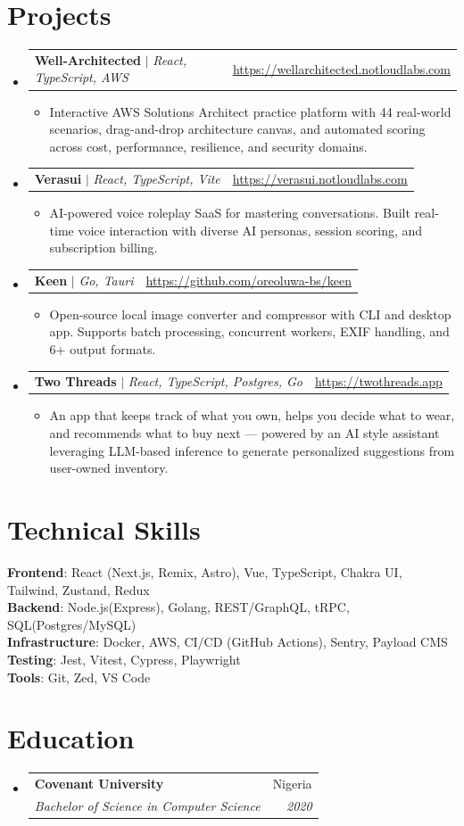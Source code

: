 \documentclass[letterpaper,11pt]{article}
\makeatletter
\newcommand{\resumeItem}[1]{
  \item\small{
    {#1 \vspace{-2pt}}
  }
}
\newcommand{\resumeSubheading}[4]{
  \vspace{-2pt}\item
    \begin{tabular*}{0.97\textwidth}[t]{l@{\extracolsep{\fill}}r}
      \textbf{#1} & #2 \\
      \textit{\small#3} & \textit{\small #4} \\
    \end{tabular*}\vspace{-7pt}
}
\newcommand{\resumeProjectHeading}[2]{
    \item
    \begin{tabular*}{0.97\textwidth}{l@{\extracolsep{\fill}}r}
      \small#1 & #2 \\
    \end{tabular*}\vspace{-7pt}
}
\newcommand{\resumeSubHeadingListStart}{\begin{itemize}[leftmargin=0.15in, label={}]}
\newcommand{\resumeSubHeadingListEnd}{\end{itemize}}
\newcommand{\resumeItemListStart}{\begin{itemize}}
\newcommand{\resumeItemListEnd}{\end{itemize}\vspace{-5pt}}
\makeatother
\begin{document}
  \section{Projects}
      \resumeSubHeadingListStart
        \resumeProjectHeading
            {\textbf{Well-Architected} $|$ \emph{React, TypeScript, AWS}}{\url{https://wellarchitected.notloudlabs.com}}
            \resumeItemListStart
              \resumeItem{Interactive AWS Solutions Architect practice platform with 44 real-world scenarios, drag-and-drop architecture canvas, and automated scoring across cost, performance, resilience, and security domains.}
            \resumeItemListEnd
        \resumeProjectHeading
            {\textbf{Verasui} $|$ \emph{React, TypeScript, Vite}}{\url{https://verasui.notloudlabs.com}}
            \resumeItemListStart
              \resumeItem{AI-powered voice roleplay SaaS for mastering conversations. Built real-time voice interaction with diverse AI personas, session scoring, and subscription billing.}
            \resumeItemListEnd
        \resumeProjectHeading
            {\textbf{Keen} $|$ \emph{Go, Tauri}}{\url{https://github.com/oreoluwa-bs/keen}}
            \resumeItemListStart
              \resumeItem{Open-source local image converter and compressor with CLI and desktop app. Supports batch processing, concurrent workers, EXIF handling, and 6+ output formats.}
            \resumeItemListEnd
        \resumeProjectHeading
            {\textbf{Two Threads} $|$ \emph{React, TypeScript, Postgres, Go}}{\url{https://twothreads.app}}
            \resumeItemListStart
              \resumeItem{An app that keeps track of what you own, helps you decide what to wear, and recommends what to buy next — powered by an AI style assistant leveraging LLM-based inference to generate personalized suggestions from user-owned inventory.}
            \resumeItemListEnd
      \resumeSubHeadingListEnd



\section{Technical Skills}
 \begin{itemize}[leftmargin=0.15in, label={}]
    \small{\item{
     \textbf{Frontend}{: React (Next.js, Remix, Astro), Vue, TypeScript, Chakra UI, Tailwind, Zustand, Redux} \\
     \textbf{Backend}{: Node.js(Express), Golang, REST/GraphQL, tRPC, SQL(Postgres/MySQL)} \\
     \textbf{Infrastructure}{: Docker, AWS, CI/CD (GitHub Actions), Sentry, Payload CMS} \\
     \textbf{Testing}{: Jest, Vitest, Cypress, Playwright} \\
     \textbf{Tools}{: Git, Zed, VS Code} \\
    }}
 \end{itemize}


\section{Education}
\resumeSubHeadingListStart
    \resumeSubheading
    {Covenant University}{Nigeria}
    {Bachelor of Science in Computer Science}{2020}
\resumeSubHeadingListEnd


\end{document}
